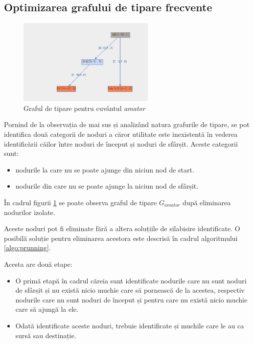 \subsection{Optimizarea grafului de tipare frecvente}

\begin{figure}[h]
    \centering
    \includegraphics[width=0.6\textwidth]{figures/rosil-amator-prunned.png}
    \caption{Graful de tipare pentru cuvântul \textit{amator}}
    \label{fig:rosil-amator-prunned}
\end{figure}

Pornind de la observația de mai sus și analizând natura grafurile de tipare, se pot identifica două categorii de noduri a căror utilitate este inexistentă în vederea identificării căilor între noduri de început și noduri de sfârșit. Aceste categorii sunt:
\begin{itemize}
\item nodurile la care nu se poate ajunge din niciun nod de start.
\item nodurile din care nu se poate ajunge la niciun nod de sfârșit. 
\end{itemize}

\begin{ex}
În cadrul figurii \ref{fig:rosil-amator-prunned} se poate observa graful de tipare $G_{amator}$ după eliminarea nodurilor izolate.
\end{ex}

Aceste noduri pot fi eliminate fără a altera soluțiile de silabisire identificate. O posibilă soluție pentru eliminarea acestora este descrisă în cadrul algoritmului \ref{algo:prunning}. 

Acesta are două etape: 
\begin{itemize}
\item O primă etapă în cadrul căreia sunt identificate nodurile care nu sunt noduri de sfârșit și nu există nicio muchie care să pornească de la acestea, respectiv nodurile care nu sunt noduri de început și pentru care nu există nicio muchie care să ajungă la ele.
\item Odată identificate aceste noduri, trebuie identificate și muchile care le au ca sursă sau destinație.
\end{itemize}

